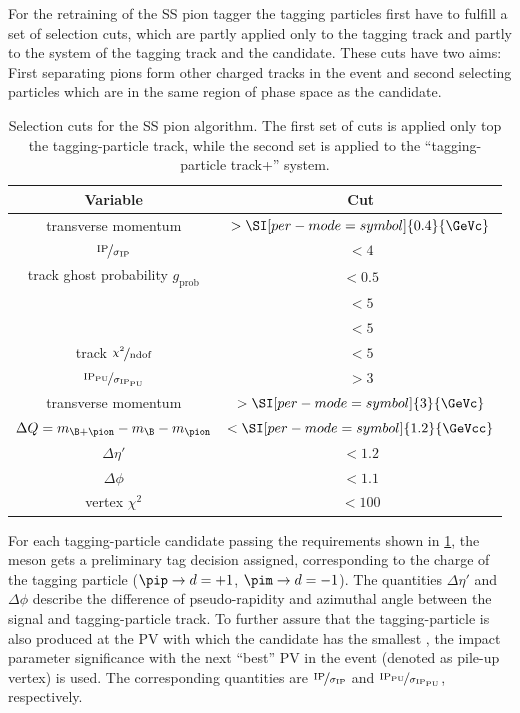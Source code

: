 For the retraining of the SS pion tagger the tagging particles first have to fulfill a set of selection cuts, which are partly applied only to the tagging track and partly to the system of the tagging track and the \B candidate. These cuts have two aims:
First separating pions form other charged tracks in the event and second selecting particles which are in the same region of phase space as the \B candidate.
\begin{table}[tbp]
	\centering
	\caption{Selection cuts for the SS pion algorithm.
	The first set of cuts is applied only top the tagging-particle track, while the second set is applied to the \enquote{tagging-particle track+\B} system.}
	\begin{tabular}{cc}
		\toprule
		Variable & Cut \\
		\midrule
		transverse momentum \pt 											& $>\SI[per-mode=symbol]{0.4}{\GeVc}$ \\
		$\nicefrac{\text{IP}}{\sigma_{\text{IP}}}$							& $<4$ \\
		track ghost probability $g_{\text{prob}}$ 							& $<0.5$ \\
		\dllppi 															& $<5$ \\
		\dllkpi 															& $<5$ \\
		track $\nicefrac{\chi^2}{\text{ndof}}$ 								& $<5$ \\
		$\nicefrac{\text{IP}_{\text{PU}}}{\sigma_{\text{IP}_{\text{PU}}}}$ 	& $>3$ \\
		\midrule
		transverse momentum \pt 					& $>\SI[per-mode=symbol]{3}{\GeVc}$ \\
		$\Delta Q=m_{\B+\pion}-m_{\B}-m_{\pion}$ 	& $<\SI[per-mode=symbol]{1.2}{\GeVcc}$ \\
		$\Delta\eta'$								& $<1.2$ \\
		$\Delta\phi$								& $<1.1$ \\
		vertex $\chi^2$ 							& $<100$ \\
		\bottomrule
	\end{tabular}
	\label{tab:SSPionselectionCuts}
\end{table}
For each tagging-particle candidate passing the requirements shown in \cref{tab:SSPionselectionCuts}, the \B meson gets a preliminary tag decision assigned, corresponding to the charge of the tagging particle (\mbox{$\pip\rightarrow d=+1$}, \mbox{$\pim\rightarrow d=-1$}).
The quantities $\Delta\eta'$ and $\Delta\phi$ describe the difference of pseudo-rapidity and azimuthal angle between the signal and tagging-particle track.
To further assure that the tagging-particle is also produced at the \ac{PV} with which the \B candidate has the smallest \chisqip, the impact parameter significance with the next \enquote{best} PV in the event (denoted as pile-up vertex) is used.
The corresponding quantities are $\nicefrac{\text{IP}}{\sigma_{\text{IP}}}$ and $\nicefrac{\text{IP}_{\text{PU}}}{\sigma_{\text{IP}_{\text{PU}}}}$, respectively.

